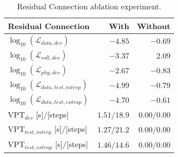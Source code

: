 \begin{table}[!b]
\caption{Residual Connection ablation experiment.}
\label{tab:ress_conn}
\centering
\begin{tabular}{l|r|r|}
\textbf{Residual Connection}                   & \textbf{With} & \textbf{Without} \\ \hline
$\log_{10}(\mathcal{L}_{data,dev})$            & $\bm{-4.85}$  & $-0.69$          \\ \hline
$\log_{10}(\mathcal{L}_{roll,dev})$            & $\bm{-3.37}$  & $2.09$           \\ \hline
$\log_{10}(\mathcal{L}_{phy,dev})$             & $\bm{-2.67}$  & $-0.83$          \\ \hline
$\log_{10}(\mathcal{L}_{data,test,interp})$    & $\bm{-4.99}$  & $-0.79$          \\ \hline
$\log_{10}(\mathcal{L}_{data,test,extrap})$    & $\bm{-4.70}$  & $-0.61$          \\ \hline
$\text{VPT}_{dev}$ {[}s{]}/{[}steps{]}         & $\bm{1.51}$/$18.9$ & $0.00$/$0.00$    \\ \hline
$\text{VPT}_{test,interp}$ {[}s{]}/{[}steps{]} & $\bm{1.27}$/$21.2$ & $0.00$/$0.00$    \\ \hline
$\text{VPT}_{test,extrap}$ {[}s{]}/{[}steps{]} & $\bm{1.46}$/$14.6$ & $0.00$/$0.00$   
\end{tabular}
\end{table}

